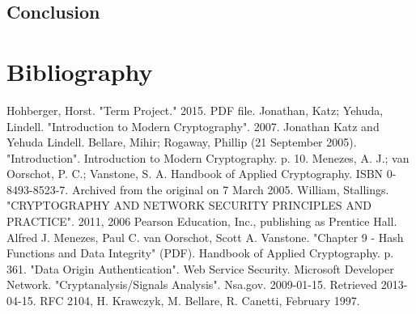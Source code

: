 \documentclass[12pt,a4paper,oneside]{report}
\begin{document}
\section{Conclusion}



\chapter{  Bibliography}


\begin{thebibliography}{0}
Hohberger, Horst. "Term Project." 2015. PDF file.
Jonathan, Katz; Yehuda, Lindell. "Introduction to Modern Cryptography". 2007. Jonathan Katz and Yehuda Lindell. 
Bellare, Mihir; Rogaway, Phillip (21 September 2005). "Introduction". Introduction to Modern Cryptography. p. 10.
Menezes, A. J.; van Oorschot, P. C.; Vanstone, S. A. Handbook of Applied Cryptography. ISBN 0-8493-8523-7. Archived from the original on 7 March 2005.
William, Stallings. "CRYPTOGRAPHY AND NETWORK SECURITY PRINCIPLES AND PRACTICE". 2011, 2006 Pearson Education, Inc., publishing as Prentice Hall.
Alfred J. Menezes, Paul C. van Oorschot, Scott A. Vanstone. "Chapter 9 - Hash Functions and Data Integrity" (PDF). Handbook of Applied Cryptography. p. 361.
"Data Origin Authentication". Web Service Security. Microsoft Developer Network.
"Cryptanalysis/Signals Analysis". Nsa.gov. 2009-01-15. Retrieved 2013-04-15.
 RFC 2104, H. Krawczyk, M. Bellare, R. Canetti, February 1997.

\end{thebibliography}
\end{document}
